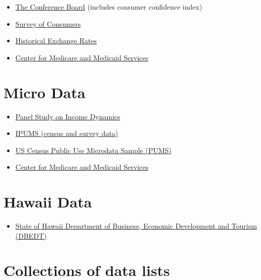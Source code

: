 \documentclass[]{book}
\providecommand{\tightlist}{%
  \setlength{\itemsep}{0pt}\setlength{\parskip}{0pt}}
\theoremstyle{definition}
\theoremstyle{definition}
\theoremstyle{remark}
\begin{document}
\begin{itemize}
\tightlist
\item
  \href{https://www.conference-board.org/data/}{The Conference Board}
  (includes consumer confidence index)
\item
  \href{http://www.sca.isr.umich.edu/tables.html}{Survey of Consumers}
\item
  \href{https://measuringworth.com/datasets/}{Historical Exchange Rates}
\item
  \href{https://dnav.cms.gov}{Center for Medicare and Medicaid Services}
\end{itemize}

\section*{Micro Data}\label{micro-data}

\begin{itemize}
\tightlist
\item
  \href{http://simba.isr.umich.edu/data/data.aspx}{Panel Study on Income
  Dynamics}
\item
  \href{https://www.ipums.org/}{IPUMS (census and survey data)}
\item
  \href{https://www.census.gov/programs-surveys/acs/data/pums.html}{US
  Census Public Use Microdata Sample (PUMS)}
\item
  \href{https://dnav.cms.gov}{Center for Medicare and Medicaid Services}
\end{itemize}

\section*{Hawaii Data}\label{hawaii-data}

\begin{itemize}
\tightlist
\item
  \href{http://dbedt.hawaii.gov/economic/databook/}{State of Hawaii
  Department of Business, Economic Development and Tourism (DBEDT)}
\end{itemize}

\section*{Collections of data lists}\label{collections-of-data-lists}
\end{document}
